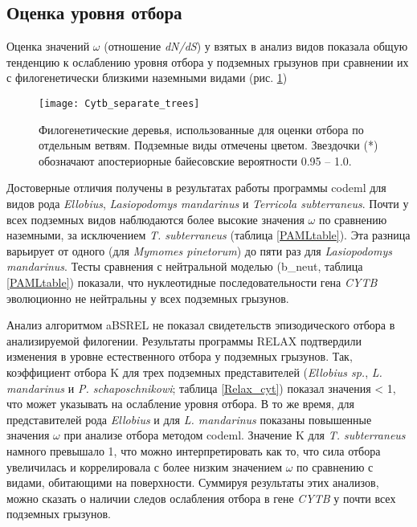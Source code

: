 \subsection{Оценка уровня отбора}
Оценка значений $\omega$ (отношение \textit{dN/dS}) у взятых в анализ видов показала общую тенденцию к ослаблению уровня отбора у подземных грызунов при сравнении их с филогенетически близкими наземными видами (рис. \ref{Tree4Selection})


\begin{figure}[h!]
	\begin{center}
		\texttt{[image: Cytb\_separate\_trees]}
	\end{center}
	\caption{Филогенетические деревья, использованные для оценки отбора по отдельным ветвям. Подземные виды отмечены цветом. Звездочки (*) обозначают апостериорные байесовские вероятности 0.95 -- 1.0.} \label{Tree4Selection}
\end{figure}


 Достоверные отличия получены в результатах работы программы codeml для видов рода \textit{Ellobius}, \textit{Lasiopodomys mandarinus} и \textit{Terricola subterraneus}. Почти у всех подземных видов наблюдаются более высокие значения $\omega$ по сравнению наземными, за исключением \textit{T. subterraneus} (таблица \ref{PAMLtable}). Эта разница варьирует от одного (для \textit{Mymomes pinetorum}) до пяти раз для \textit{Lasiopodomys mandarinus}. Тесты сравнения с нейтральной моделью (b\_neut, таблица \ref{PAMLtable}) показали, что нуклеотидные последовательности гена \textit{CYTB} эволюционно не нейтральны у всех подземных грызунов. 

Анализ алгоритмом aBSREL не показал свидетельств эпизодического отбора в анализируемой филогении. Результаты программы RELAX подтвердили изменения в уровне естественного отбора у подземных грызунов. Так, коэффициент отбора K для трех подземных представителей (\textit{Ellobius sp.}, \textit{L. mandarinus} и \textit{P. schaposchnikowi}; таблица \ref{Relax_cyt}) показал значения < 1, что может указывать на ослабление уровня отбора. В то же время, для представителей рода \textit{Ellobius} и для \textit{L. mandarinus} показаны повышенные значения $\omega$ при анализе отбора методом codeml. Значение K для \textit{T. subterraneus} намного превышало 1, что можно интерпретировать как то, что сила отбора увеличилась и коррелировала с более низким значением $\omega$ по сравнению с видами, обитающими на поверхности. Суммируя результаты этих анализов, можно сказать о наличии следов ослабления отбора в гене \textit{CYTB} у почти всех подземных грызунов.


